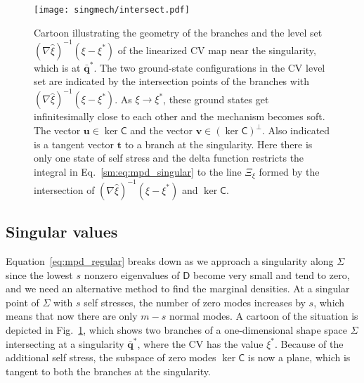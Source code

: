 \begin{figure}
  \begin{center}
    \texttt{[image: singmech/intersect.pdf]}
  \end{center}
  \caption{Cartoon illustrating the geometry of the branches and the level set $(\nabla\hat{\xi})^{-1}(\xi - \xi^{*})$ of the linearized CV map near the singularity, which is at $\bar{\bm{q}}^{*}$.
    The two ground-state configurations in the CV level set are indicated by the intersection points of the branches with $(\nabla\hat{\xi})^{-1}(\xi - \xi^{*})$.  As $\xi \to \xi^{*}$, these ground states get infinitesimally close to each other and the mechanism becomes soft.
    The vector $\bm{u} \in \ker\mathsf{C}$ and the vector $\bm{v} \in (\ker\mathsf{C})^{\perp}$.
    Also indicated is a tangent vector $\bm{t}$ to a branch at the singularity.
    Here there is only one state of self stress and the delta function restricts the integral in Eq.~\eqref{sm:eq:mpd_singular} to the line $\Xi_{\xi}$ formed by the intersection of $(\nabla\hat{\xi})^{-1}(\xi - \xi^{*})$ and $\ker\mathsf{C}$.
  }
  \label{sm:fig:intersect}
\end{figure}

\subsection{Singular values}
\label{sm:sec:singular}

Equation~\eqref{eq:mpd_regular} breaks down as we approach a singularity along $\Sigma$ since the lowest $s$ nonzero eigenvalues of $\mathsf{D}$ become very small and tend to zero, and we need an alternative method to find the marginal densities.
At a singular point of $\Sigma$ with $s$ self stresses, the number of zero modes increases by $s$, which means that now there are only $m-s$ normal modes.
A cartoon of the situation is depicted in Fig.~\ref{sm:fig:intersect}, which shows two branches of a one-dimensional shape space $\Sigma$ intersecting at a singularity $\bar{\bm{q}}^{*}$, where the CV has the value $\xi^{*}$.
Because of the additional self stress, the subspace of zero modes $\ker\mathsf{C}$ is now a plane, which is tangent to both the branches at the singularity.

